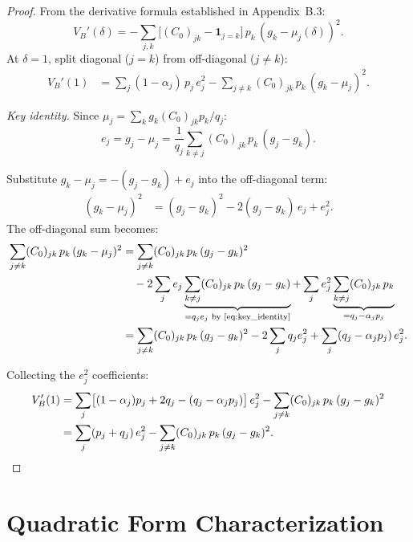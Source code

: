 \documentclass[11pt]{article}
\begin{document}
\begin{proof}
From the derivative formula established in Appendix~B.3:
\begin{equation}
  V_B'(\delta) = -\sum_{j,k} \bigl[(C_0)_{jk} - \mathbf{1}_{j=k}\bigr]\,p_k\,(g_k - \mu_j(\delta))^2.
  \label{eq:dVB}
\end{equation}
At $\delta=1$, split diagonal ($j=k$) from off-diagonal ($j \neq k$):
\begin{align*}
  V_B'(1) &= \sum_j (1 - \alpha_j)\,p_j\,e_j^2 - \sum_{j \neq k} (C_0)_{jk}\,p_k\,(g_k - \mu_j)^2.
\end{align*}

\emph{Key identity.}
Since $\mu_j = \sum_k g_k (C_0)_{jk} p_k / q_j$:
\begin{equation}
  e_j = g_j - \mu_j = \frac{1}{q_j}\sum_{k \neq j} (C_0)_{jk}\,p_k\,(g_j - g_k).
  \label{eq:key_identity}
\end{equation}

Substitute $g_k - \mu_j = -(g_j - g_k) + e_j$ into the off-diagonal term:
\begin{align*}
  (g_k - \mu_j)^2 &= (g_j - g_k)^2 - 2(g_j - g_k)\,e_j + e_j^2.
\end{align*}
The off-diagonal sum becomes:
\begin{align*}
  \sum_{j \neq k} (C_0)_{jk}\,p_k\,(g_k - \mu_j)^2
  &= \sum_{j \neq k} (C_0)_{jk}\,p_k\,(g_j-g_k)^2 \\
  &\quad - 2\sum_j e_j \underbrace{\sum_{k\neq j} (C_0)_{jk}\,p_k\,(g_j-g_k)}_{= q_j e_j\text{ by \eqref{eq:key_identity}}}
  + \sum_j e_j^2 \underbrace{\sum_{k\neq j} (C_0)_{jk}\,p_k}_{= q_j - \alpha_j p_j} \\
  &= \sum_{j \neq k} (C_0)_{jk}\,p_k\,(g_j-g_k)^2 - 2\sum_j q_j e_j^2 + \sum_j (q_j - \alpha_j p_j)\,e_j^2.
\end{align*}

Collecting the $e_j^2$ coefficients:
\begin{align*}
  V_B'(1) &= \sum_j \bigl[(1-\alpha_j)p_j + 2q_j - (q_j - \alpha_j p_j)\bigr]\,e_j^2
             - \sum_{j\neq k} (C_0)_{jk}\,p_k\,(g_j-g_k)^2 \\
          &= \sum_j (p_j + q_j)\,e_j^2
             - \sum_{j\neq k} (C_0)_{jk}\,p_k\,(g_j-g_k)^2. \qedhere
\end{align*}
\end{proof}

\section{Quadratic Form Characterization}
\end{document}
